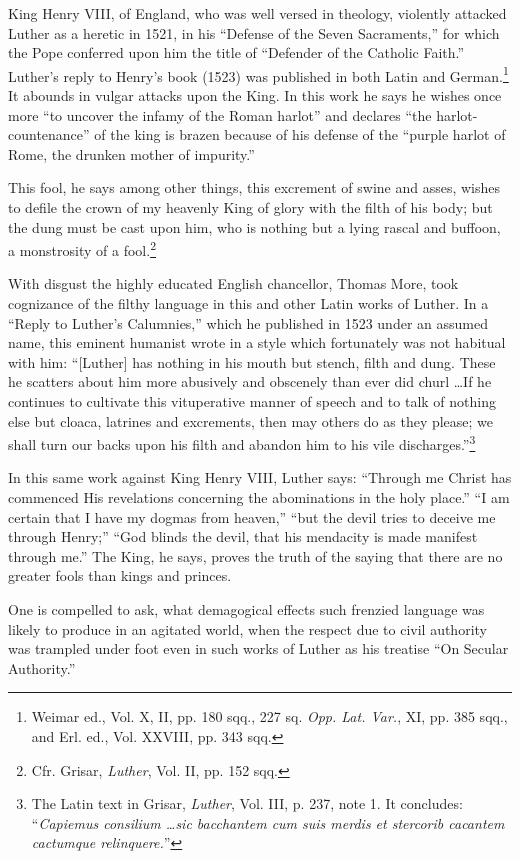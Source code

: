 King Henry VIII, of England, who was well versed in theology, violently
attacked Luther as a heretic in 1521, in his ``Defense of
the Seven Sacraments,'' for which the Pope conferred upon him the
title of ``Defender of the Catholic Faith.'' Luther's reply to Henry's
book (1523) was published in both Latin and German.\footnote
{Weimar ed., Vol. X, II, pp. 180 sqq., 227 sq. \textit{Opp. Lat. Var.}, XI, pp. 385 sqq., and
Erl. ed., Vol. XXVIII, pp. 343 sqq. }
It abounds
in vulgar attacks upon the King. In this work he says he wishes
once more ``to uncover the infamy of the Roman harlot'' and declares
``the harlot-countenance'' of the king is brazen because of his
defense of the ``purple harlot of Rome, the drunken mother of impurity.''


This fool, he says among other things, this excrement of swine and asses,
wishes to defile the crown of my heavenly King of glory with the filth of
his body; but the dung must be cast upon him, who is nothing but a lying
rascal and buffoon, a monstrosity of a fool.\footnote{Cfr. Grisar, \textit{Luther}, Vol. II, pp. 152 sqq. }

With disgust the highly educated English chancellor, Thomas More, took
cognizance of the filthy language in this and other Latin works of Luther.
In a ``Reply to Luther's Calumnies,'' which he published in 1523 under an
assumed name, this eminent humanist wrote in a style which fortunately
was not habitual with him: ``[Luther] has nothing in his mouth but stench,
filth and dung. These he scatters about him more abusively and obscenely
than ever did churl \dots If he continues to cultivate this vituperative manner
of speech and to talk of nothing else but cloaca, latrines and excrements,
then may others do as they please; we shall turn our backs upon his filth
and abandon him to his vile discharges.''\footnote
{The Latin text in Grisar, \textit{Luther}, Vol. III, p. 237, note 1. It concludes: “\textit{Capiemus
consilium \dots sic bacchantem cum suis merdis et stercorib cacantem cactumque
relinquere.}”}


In this same work against King Henry VIII, Luther says: “Through me
Christ has commenced His revelations concerning the abominations in the holy
place.” “I am certain that I have my dogmas from heaven,” “but the devil
tries to deceive me through Henry;” “God blinds the devil, that his mendacity
is made manifest through me.” The King, he says, proves the truth
of the saying that there are no greater fools than kings and princes.

One is compelled to ask, what demagogical effects such frenzied
language was likely to produce in an agitated world, when the
respect due to civil authority was trampled under foot even in such
works of Luther as his treatise “On Secular Authority.”

